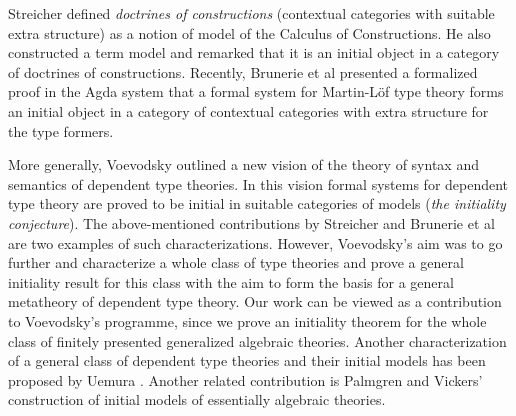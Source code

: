 \documentclass{mscs}
\begin{document}
Streicher \cite{streicher:semtt} defined {\em doctrines of constructions} (contextual categories with suitable extra structure) as a notion of model of the Calculus of Constructions. He also constructed a term model and remarked that it is an initial object in a category of doctrines of constructions.
Recently, Brunerie et al \cite{brunerie:initiality} presented a formalized proof in the Agda system that a formal system for Martin-Löf type theory forms an initial object in a category of contextual categories with extra structure for
the type formers.

More generally, Voevodsky \cite{voevodsky:initiality} outlined a new vision of the theory of syntax and semantics of dependent type theories. In this vision formal systems for dependent type theory are proved to be initial in suitable categories of models ({\em the initiality conjecture}). The above-mentioned contributions by Streicher and Brunerie et al are two examples of such characterizations. However, Voevodsky's aim was to go further and characterize a whole class of type theories and prove a general initiality result for this class with the aim to form the basis for a general metatheory of dependent type theory. Our work can be viewed as a contribution to Voevodsky's programme, since we prove an initiality theorem for the whole class of finitely presented generalized algebraic theories. Another characterization of a general class of dependent type theories and their initial models has been proposed by Uemura \cite{uemura:general-framework}. Another related contribution is Palmgren and Vickers' \cite{palmgrenvickers} construction of initial models of essentially algebraic theories.
\end{document}
